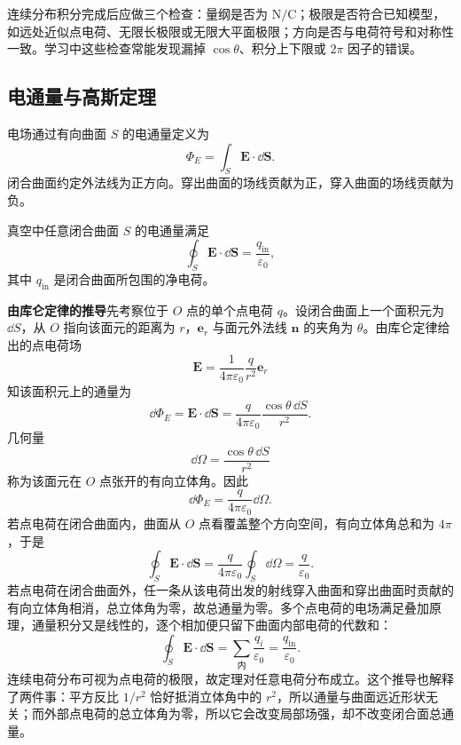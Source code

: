 \begin{method}[场强积分的检查方法]
连续分布积分完成后应做三个检查：量纲是否为 $\mathrm{N/C}$；极限是否符合已知模型，如远处近似点电荷、无限长极限或无限大平面极限；方向是否与电荷符号和对称性一致。学习中这些检查常能发现漏掉 $\cos\theta$、积分上下限或 $2\pi$ 因子的错误。
\end{method}

\subsection{电通量与高斯定理}

\begin{definition}[电通量]\label{def:electric-flux}
电场通过有向曲面 $S$ 的电通量定义为
\[
  \Phi_E=\int_S \bm E\cdot \dd \bm S.
\]
闭合曲面约定外法线为正方向。穿出曲面的场线贡献为正，穿入曲面的场线贡献为负。
\end{definition}

\begin{theorem}[高斯定理]\label{thm:gauss-electric}
真空中任意闭合曲面 $S$ 的电通量满足
\[
  \oint_S \bm E\cdot \dd \bm S=\frac{q_{\mathrm{in}}}{\varepsilon_0},
\]
其中 $q_{\mathrm{in}}$ 是闭合曲面所包围的净电荷。
\end{theorem}

\textbf{由库仑定律的推导}\quad 先考察位于 $O$ 点的单个点电荷 $q$。设闭合曲面上一个面积元为 $\dd S$，从 $O$ 指向该面元的距离为 $r$，$\bm e_r$ 与面元外法线 $\bm n$ 的夹角为 $\theta$。由库仑定律给出的点电荷场
\[
  \bm E=\frac{1}{4\pi\varepsilon_0}\frac{q}{r^2}\bm e_r
\]
知该面积元上的通量为
\[
  \dd\Phi_E=\bm E\cdot\dd\bm S
  =\frac{q}{4\pi\varepsilon_0}\frac{\cos\theta\,\dd S}{r^2}.
\]
几何量
\[
  \dd\Omega=\frac{\cos\theta\,\dd S}{r^2}
\]
称为该面元在 $O$ 点张开的有向立体角。因此
\[
  \dd\Phi_E=\frac{q}{4\pi\varepsilon_0}\dd\Omega.
\]
若点电荷在闭合曲面内，曲面从 $O$ 点看覆盖整个方向空间，有向立体角总和为 $4\pi$，于是
\[
  \oint_S\bm E\cdot\dd\bm S
  =\frac{q}{4\pi\varepsilon_0}\oint_S\dd\Omega
  =\frac{q}{\varepsilon_0}.
\]
若点电荷在闭合曲面外，任一条从该电荷出发的射线穿入曲面和穿出曲面时贡献的有向立体角相消，总立体角为零，故总通量为零。多个点电荷的电场满足叠加原理，通量积分又是线性的，逐个相加便只留下曲面内部电荷的代数和：
\[
  \oint_S\bm E\cdot\dd\bm S
  =\sum_{\text{内}}\frac{q_i}{\varepsilon_0}
  =\frac{q_{\mathrm{in}}}{\varepsilon_0}.
\]
连续电荷分布可视为点电荷的极限，故定理对任意电荷分布成立。这个推导也解释了两件事：平方反比 $1/r^2$ 恰好抵消立体角中的 $r^2$，所以通量与曲面远近形状无关；而外部点电荷的总立体角为零，所以它会改变局部场强，却不改变闭合面总通量。

